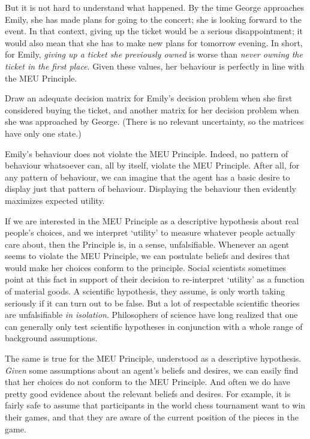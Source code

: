 But it is not hard to understand what happened. By the time George
approaches Emily, she has made plans for going to the concert; she is
looking forward to the event. In that context, giving up the ticket
would be a serious disappointment; it would also mean that she has to
make new plans for tomorrow evening. In short, for Emily, \emph{giving
  up a ticket she previously owned} is worse than \emph{never owning
  the ticket in the first place}. Given these values, her behaviour is
perfectly in line with the MEU Principle.

\begin{exercise2}
  Draw an adequate decision matrix for Emily's decision problem when
  she first considered buying the ticket, and another matrix for her
  decision problem when she was approached by George. (There is no
  relevant uncertainty, so the matrices have only one state.)
\end{exercise2}

Emily's behaviour does not violate the MEU Principle. Indeed, no
pattern of behaviour whatsoever can, all by itself, violate the MEU
Principle. After all, for any pattern of behaviour, we can imagine
that the agent has a basic desire to display just that pattern of
behaviour. Displaying the behaviour then evidently maximizes expected
utility.

If we are interested in the MEU Principle as a descriptive hypothesis about real
people's choices, and we interpret `utility' to measure whatever people actually
care about, then the Principle is, in a sense, unfalsifiable. Whenever an agent
seems to violate the MEU Principle, we can postulate beliefs and desires that
would make her choices conform to the principle. Social scientists sometimes
point at this fact in support of their decision to re-interpret `utility' as a
function of material goods. A scientific hypothesis, they assume, is only worth
taking seriously if it can turn out to be false. But a lot of respectable
scientific theories are unfalsifiable \emph{in isolation}. Philosophers of
science have long realized that one can generally only test scientific
hypotheses in conjunction with a whole range of background assumptions.

The same is true for the MEU Principle, understood as a descriptive
hypothesis. \emph{Given} some assumptions about an agent's beliefs and
desires, we can easily find that her choices do not conform to the MEU
Principle. And often we do have pretty good evidence about the
relevant beliefs and desires. For example, it is fairly safe to assume
that participants in the world chess tournament want to win their
games, and that they are aware of the current position of the pieces
in the game.

